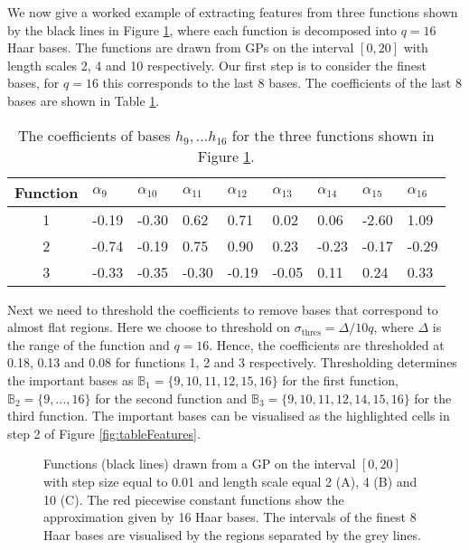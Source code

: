 \documentclass[12pt]{book} %
\begin{document}
 
 We now give a worked example of extracting features from three functions shown by the black lines in Figure \ref{fig:Extractfeature}, where each function is decomposed into $q = 16$ Haar bases. The functions are drawn from GPs on the interval $[0,20]$ with length scales 2, 4 and 10 respectively. Our first step is to consider the finest bases, for $q=16$ this corresponds to the last 8 bases. The coefficients of the last 8 bases are shown in Table \ref{table:Haar_Features}. 

\begin{table}[h!]
  \begin{center}
    \begin{tabular}{|c|l|l|l|l|l|l|l|l|}
    \hline
      \textbf{Function} & $\alpha_{9}$ & $\alpha_{10}$ & $\alpha_{11}$  & $\alpha_{12}$ & $\alpha_{13}$ & $\alpha_{14}$ & $\alpha_{15}$ & $\alpha_{16}$  \\ 
      \hline
      1 &-0.19 &-0.30&  0.62&  0.71 & 0.02&  0.06& -2.60 & 1.09  \\
 	  2 & -0.74 &-0.19  &0.75  &0.90 & 0.23 &-0.23 &-0.17 &-0.29\\
 	  3 &  -0.33 &-0.35& -0.30& -0.19& -0.05&  0.11 & 0.24 & 0.33\\ \hline
    \end{tabular}
  \end{center}
    \caption{The coefficients of bases $h_9, \dots h_{16}$ for the three functions shown in Figure \ref{fig:Extractfeature}. }
     \label{table:Haar_Features}
\end{table} 
  
  Next we need to threshold the coefficients to remove bases that correspond to almost flat regions. Here we choose to threshold  on $\sigma_{\mathrm{thres}} = \Delta/10q$, where $\Delta$ is the range of the function and $q=16$. Hence, the coefficients are thresholded at  0.18, 0.13 and 0.08 for functions 1, 2 and 3 respectively. Thresholding determines the important bases as $\mathbb{B}_1 = \{9,10,11,12,15,16\}$ for the first function, $\mathbb{B}_2 = \{9, \dots, 16\}$ for the second function and $\mathbb{B}_3 = \{9,10,11,12,14,15,16\}$ for the third function. The important bases can be visualised as the highlighted cells in step 2 of Figure \ref{fig:tableFeatures}.
  
    \begin{figure}[ht!]
   \hrulefill
   \begin{center} 
     \quad
       \vspace{0.1mm} 
   \quad
    \end{center}     
    \caption{ Functions (black lines) drawn from a GP on the interval $[0,20]$ with step size equal to 0.01 and length scale equal 2 (A), 4 (B) and 10 (C). The red piecewise constant functions show the approximation given by 16 Haar bases. The intervals of the finest 8 Haar bases are visualised by the regions separated by the grey lines. }
    \label{fig:Extractfeature}
    \hrulefill
    \end{figure}
    
\end{document}

